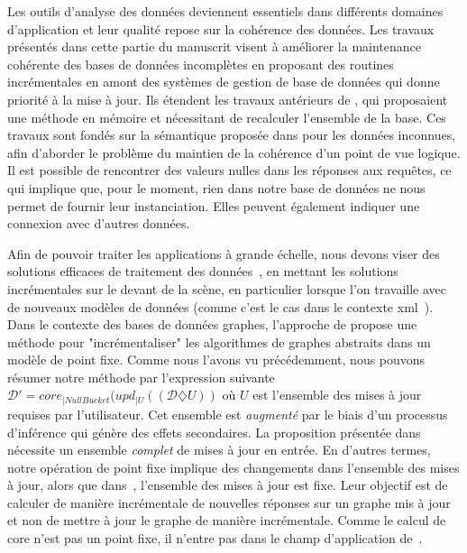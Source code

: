 Les outils d'analyse des données deviennent essentiels dans différents domaines d'application et leur qualité repose sur la cohérence des données.
Les travaux présentés dans cette partie du manuscrit visent à améliorer la maintenance cohérente des bases de données incomplètes en proposant des routines incrémentales en amont des systèmes de gestion de base de données qui donne priorité à la mise à jour.
Ils étendent les travaux antérieurs de \cite{chabinConsistentUpdatingDatabases2020}, qui proposaient une méthode en mémoire et nécessitant de recalculer l'ensemble de la base.
Ces travaux sont fondés sur la sémantique proposée dans \cite{reiterSoundSometimesComplete1986} pour les données inconnues, afin d'aborder le problème du maintien de la cohérence d'un point de vue logique.
Il est possible de rencontrer des valeurs nulles dans les réponses aux requêtes, ce qui implique que, pour le moment, rien dans notre base de données ne nous permet de fournir leur instanciation.
Elles peuvent également indiquer une connexion avec d'autres données.

Afin de pouvoir traiter les applications à grande échelle, nous devons viser des solutions efficaces de traitement des données~\cite{sirangeloRepresentingQueryingIncomplete2014}, en mettant les solutions incrémentales sur le devant de la scène, en particulier lorsque l'on travaille avec de nouveaux modèles de données (comme c'est le cas dans le contexte \acrshort{xml}~\cite{bouchouUpdatesIncrementalValidation2003,abraoIncrementalConstraintChecking2004,balminIncrementalValidationXML2004}).
Dans le contexte des bases de données graphes, l'approche de \cite{fanIncrementalizingGraphAlgorithms2021} propose une méthode pour "incrémentaliser" les algorithmes de graphes abstraits dans un modèle de point fixe.
Comme nous l'avons vu précédemment, nous pouvons résumer notre méthode par l'expression suivante
$\mathcal{D}' = core_{|NullBucket}(upd_{|U}((\mathcal{D}\diamondsuit U))$ où $U$ est l'ensemble des mises à jour requises par l'utilisateur.
Cet ensemble est \emph{augmenté} par le biais d'un processus d'inférence qui génère des effets secondaires.
La proposition présentée dans~\cite{fanIncrementalizingGraphAlgorithms2021} nécessite un ensemble \emph{complet} de mises à jour en entrée.
En d'autres termes, notre opération de point fixe implique des changements dans l'ensemble des mises à jour, alors que dans~\cite{fanIncrementalizingGraphAlgorithms2021}, l'ensemble des mises à jour est fixe.
Leur objectif est de calculer de manière incrémentale de nouvelles réponses sur un graphe mis à jour et non de mettre à jour le graphe de manière incrémentale.
Comme le calcul de \gls{core} n'est pas un point fixe, il n'entre pas dans le champ d'application de~\cite{fanIncrementalizingGraphAlgorithms2021}.

